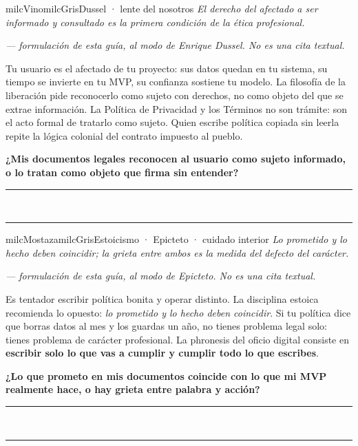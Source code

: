 \documentclass[11pt,letterpaper]{article}
\newcommand{\linead}[1]{\noindent\color{milcLinea}\rule{#1}{0.5pt}\color{milcNegro}}
\begin{document}
\begin{softbox}{milcVino}{milcGris}{Dussel · lente del nosotros}
\textit{El derecho del afectado a ser informado y consultado es la primera condición de la ética profesional.}

{\footnotesize\itshape\color{milcNegro!70}--- formulación de esta guía, al modo de Enrique Dussel. No es una cita textual.}

Tu usuario es el afectado de tu proyecto: sus datos quedan en tu sistema, su tiempo se invierte en tu MVP, su confianza sostiene tu modelo. La filosofía de la liberación pide reconocerlo como sujeto con derechos, no como objeto del que se extrae información. La Política de Privacidad y los Términos no son trámite: son el acto formal de tratarlo como sujeto. Quien escribe política copiada sin leerla repite la lógica colonial del contrato impuesto al pueblo.

\textbf{¿Mis documentos legales reconocen al usuario como sujeto informado, o lo tratan como objeto que firma sin entender?}
\end{softbox}
\linead{\linewidth}\\[1mm]
\linead{\linewidth}

\begin{softbox}{milcMostaza}{milcGris}{Estoicismo · Epicteto · cuidado interior}
\textit{Lo prometido y lo hecho deben coincidir; la grieta entre ambos es la medida del defecto del carácter.}

{\footnotesize\itshape\color{milcNegro!70}--- formulación de esta guía, al modo de Epicteto. No es una cita textual.}

Es tentador escribir política bonita y operar distinto. La disciplina estoica recomienda lo opuesto: \emph{lo prometido y lo hecho deben coincidir}. Si tu política dice que borras datos al mes y los guardas un año, no tienes problema legal solo: tienes problema de carácter profesional. La phronesis del oficio digital consiste en \textbf{escribir solo lo que vas a cumplir y cumplir todo lo que escribes}.

\textbf{¿Lo que prometo en mis documentos coincide con lo que mi MVP realmente hace, o hay grieta entre palabra y acción?}
\end{softbox}
\linead{\linewidth}\\[1mm]
\linead{\linewidth}
\end{document}
